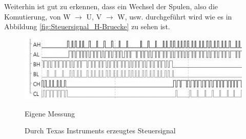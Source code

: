 Weiterhin ist gut zu erkennen, dass ein Wechsel der Spulen, also die Komutierung, von W $\rightarrow$ U, V $\rightarrow$ W, usw. durchgeführt wird wie es in Abbildung \ref{fig:Steuersignal_H-Bruecke} zu sehen ist.


\begin{figure}[htbp]
	\centering
	\includegraphics[width=\textwidth-4cm]{tests/graphics/Ansteuerung_TexasInstruments}
	\caption[Steuersignal Texas Instruments]{Durch Texas Instruments erzeugtes Steuersignal}
	\label{fig:Steuersignal_TI}
	\quelle Eigene Messung
\end{figure}